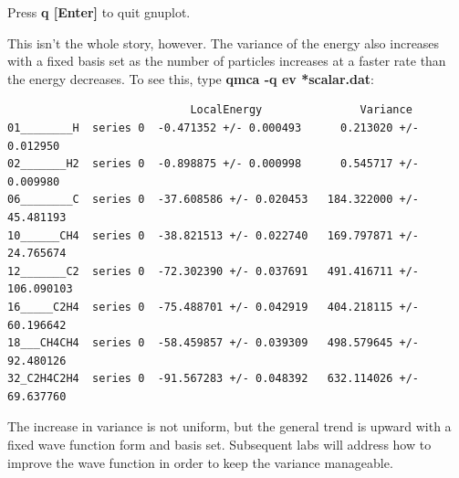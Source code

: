Press \textbf{q [Enter]} to quit gnuplot.

This isn't the whole story, however.  The variance of the energy also increases
with a fixed basis set as the number of particles increases at a faster rate
than the energy decreases.  To see this, type \textbf{qmca -q ev *scalar.dat}:

\begin{shaded}
\begin{verbatim}
                            LocalEnergy               Variance           
01________H  series 0  -0.471352 +/- 0.000493      0.213020 +/- 0.012950 
02_______H2  series 0  -0.898875 +/- 0.000998      0.545717 +/- 0.009980 
06________C  series 0  -37.608586 +/- 0.020453   184.322000 +/- 45.481193
10______CH4  series 0  -38.821513 +/- 0.022740   169.797871 +/- 24.765674
12_______C2  series 0  -72.302390 +/- 0.037691   491.416711 +/- 106.090103
16_____C2H4  series 0  -75.488701 +/- 0.042919   404.218115 +/- 60.196642
18___CH4CH4  series 0  -58.459857 +/- 0.039309   498.579645 +/- 92.480126
32_C2H4C2H4  series 0  -91.567283 +/- 0.048392   632.114026 +/- 69.637760
\end{verbatim}
\end{shaded}

The increase in variance is not uniform, but the general trend is upward with a
fixed wave function form and basis set.  Subsequent labs will address how to
improve the wave function in order to keep the variance manageable.
